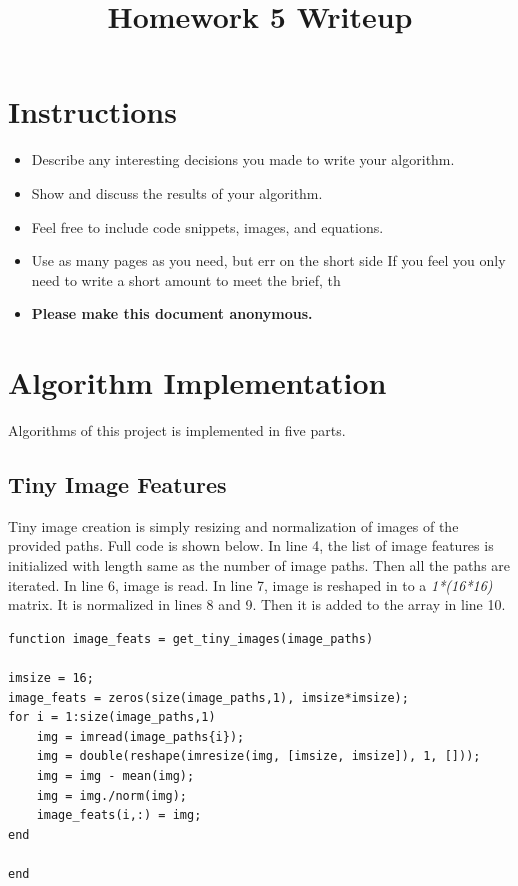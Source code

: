 \date{}

\title{\vspace{-1cm}Homework 5 Writeup}



\maketitle
\vspace{-3cm}
\thispagestyle{fancy}

\section*{Instructions}
\begin{itemize}
  \item Describe any interesting decisions you made to write your algorithm.
  \item Show and discuss the results of your algorithm.
  \item Feel free to include code snippets, images, and equations.
  \item Use as many pages as you need, but err on the short side If you feel you only need to write a short amount to meet the brief, th
  
  \item \textbf{Please make this document anonymous.}
\end{itemize}

\section*{Algorithm Implementation}
Algorithms of this project is implemented in five parts. 

\subsection{Tiny Image Features}
Tiny image creation is simply resizing and normalization of images of the provided paths. Full code is shown below. In line 4, the list of image features is initialized with length same as the number of image paths. Then all the paths are iterated. In line 6, image is read. In line 7, image is reshaped in to a \emph{1*(16*16)} matrix. It is normalized in lines 8 and 9. Then it is added to the array in line 10.
\begin{lstlisting}[style=Matlab-editor]
function image_feats = get_tiny_images(image_paths)

imsize = 16;
image_feats = zeros(size(image_paths,1), imsize*imsize);
for i = 1:size(image_paths,1)
	img = imread(image_paths{i});
	img = double(reshape(imresize(img, [imsize, imsize]), 1, []));
	img = img - mean(img);
	img = img./norm(img);
	image_feats(i,:) = img;
end

end
\end{lstlisting}
